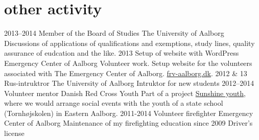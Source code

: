 \documentclass[]{friggeri-cv}
\begin{document}
\section{other activity}

\begin{entrylist}
  \entry
  {2013–2014}
  {Member of the Board of Studies}
  {The University of Aalborg}
  {Discussions of applications of qualifications and exemptions, study lines, quality assurance of eudcation and the like.}
  \entry
  {2013}
  {Setup of website with WordPress}
  {Emergency Center of Aalborg}
  {Volunteer work. Setup website for the volunteers associated with The Emergency Center of Aalborg.
  \href{http://frv-aalborg.dk}{frv-aalborg.dk}.}
  \entry
  {2012 \& 13}
  {Rus-intruktror}
  {The University of Aalborg}
  {Intruktor for new students}
  \entry
  {2012–2014}
  {Volunteer mentor}
  {Danish Red Cross Youth}
  {Part of a project \href{http://www.urk.dk/solskinsunge/}{Sunshine youth}, where we would arrange social events with the youth of a state school (Tornhøjskolen) in Eastern Aalborg.}
  \entry
  {2011-2014}
  {Volunteer firefighter}
  {Emergency Center of Aalborg}
  {Maintenance of my firefighting education}
  \entry
  {since 2009}
  {Driver's license}
  {}{}
\end{entrylist}
\end{document}
